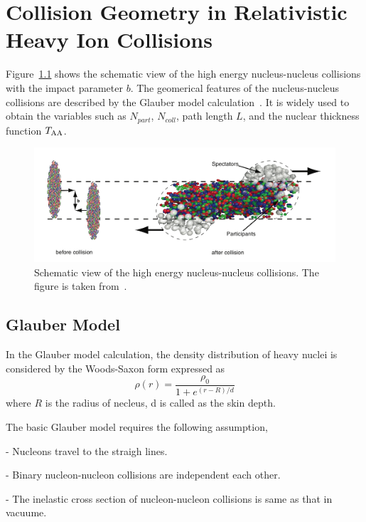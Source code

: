 \appendix
\chapter{Collision Geometry in Relativistic Heavy Ion Collisions}
\label{app_a_glauber}
Figure~\ref{fig_ap_nncoll} shows the schematic view of the high energy nucleus-nucleus collisions with the impact parameter $b$. 
The geomerical features of the nucleus-nucleus collisions are described by the Glauber model calculation~\cite{bib_glauber}. 
It is widely used to obtain the variables such as $N_{part}$, $N_{coll}$, path length $L$, and the nuclear thickness function $T_{\rm{AA}}$. 
\begin{figure}[!h]
  \centering
  \includegraphics[width=12cm]{app/figure/NN_overview.png}
  \caption{Schematic view of the high energy nucleus-nucleus collisions. The figure is taken from~\cite{bib_nncoll}.}
  \label{fig_ap_nncoll}
\end{figure}

\section{Glauber Model}
In the Glauber model calculation, the density distribution of heavy nuclei is considered by the Woods-Saxon form expressed as 
\begin{equation}
        \rho (r) = \frac{\rho_{0}}{1+e^{(r-R)/d}}
\end{equation}
where $R$ is the radius of necleus, d is called as the skin depth. 

The basic Glauber model requires the following assumption, 
\begin{description}
       \item{-} Nucleons travel to the straigh lines.
       \item{-} Binary nucleon-nucleon collisions are independent each other. 
       \item{-} The inelastic cross section of nucleon-nucleon collisions is same as that in vacuume. 
\end{description}

